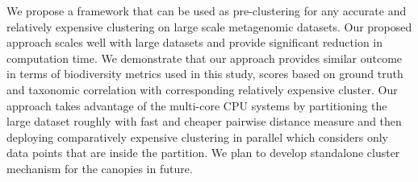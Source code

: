 \documentclass[10pt, conference, compsocconf]{IEEEtran}
\begin{document}
We propose a framework that can be used as pre-clustering for any accurate and relatively expensive clustering on large scale metagenomic datasets. Our proposed approach scales well with large datasets and provide significant reduction in computation time. We demonstrate that our approach provides similar outcome in terms of biodiversity metrics used in this study, scores based on ground truth and taxonomic correlation with corresponding relatively expensive cluster. Our approach takes advantage of the multi-core CPU systems by partitioning the large dataset roughly with fast and cheaper pairwise distance measure and then deploying comparatively expensive clustering in parallel which considers only data points that are inside the partition. We plan to develop standalone cluster mechanism for the canopies in future.   





\end{document}
